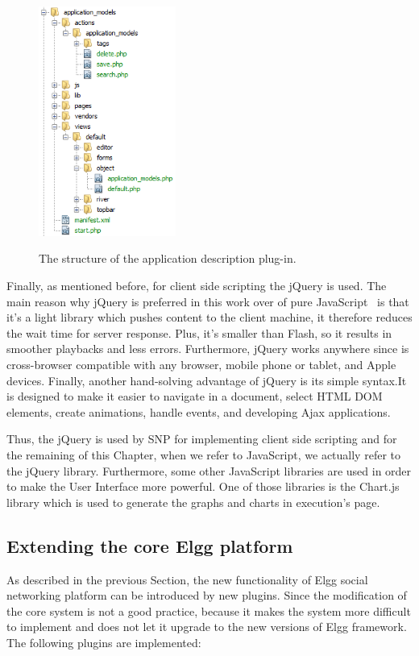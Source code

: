 \begin{figure}[h]
	\caption{The structure of the application description plug-in.}
	\includegraphics[width=0.4\textwidth]{./fig/folder_hierarchy.png}
	\centering
	\label{fig:elgg_hierarchy}
\end{figure}

Finally, as mentioned before, for client side scripting the jQuery is used. The main reason why jQuery is preferred in this work over of pure JavaScript~\cite{mccormick2004jquery} is that it's a light library which pushes content to the client machine, it therefore reduces the wait time for server response. Plus, it's smaller than Flash, so it results in smoother playbacks and less errors. Furthermore, jQuery works anywhere since is cross-browser compatible with any browser, mobile phone or tablet, and Apple devices. Finally, another hand-solving advantage of jQuery is its simple syntax.It is designed to make it easier to navigate in a document, select HTML DOM elements, create animations, handle events, and developing Ajax applications. 

Thus, the jQuery is used by SNP for implementing client side scripting and for the remaining of this Chapter, when we refer to JavaScript, we actually refer to the jQuery library. 
Furthermore, some other JavaScript libraries are used in order to make the User Interface more powerful. One of those libraries is the Chart.js~\cite{chartjs_url} library which is used to generate the graphs and charts in execution's page.

\subsection{Extending the core Elgg platform}
As described in the previous Section, the new functionality of Elgg social networking platform can be introduced by new plugins. Since the modification of the core system is not a good practice, because it makes the system more difficult to implement and does not let it upgrade to the new versions of Elgg framework. The following plugins are implemented:

